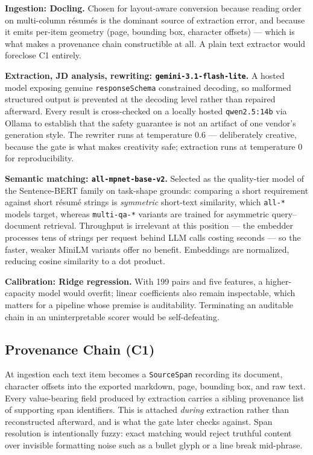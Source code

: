 \documentclass[conference]{IEEEtran}
\begin{document}
\textbf{Ingestion: Docling.} Chosen for layout-aware conversion because reading
order on multi-column résumés is the dominant source of extraction error, and
because it emits per-item geometry (page, bounding box, character offsets) ---
which is what makes a provenance chain constructible at all. A plain text
extractor would foreclose C1 entirely.

\textbf{Extraction, JD analysis, rewriting:
\texttt{gemini-3.1-flash-lite}.} A hosted model exposing genuine
\texttt{responseSchema} constrained decoding, so malformed structured output is
prevented at the decoding level rather than repaired afterward. Every result is
cross-checked on a locally hosted \texttt{qwen2.5:14b} via Ollama
\cite{ollama,qwen} to establish that the safety guarantee is not an artifact of
one vendor's generation style. The rewriter runs at temperature 0.6 ---
deliberately creative, because the gate is what makes creativity safe;
extraction runs at temperature 0 for reproducibility.

\textbf{Semantic matching: \texttt{all-mpnet-base-v2}.} Selected as the
quality-tier model of the Sentence-BERT family \cite{sbert} on task-shape
grounds: comparing a short requirement against short résumé strings is
\emph{symmetric} short-text similarity, which \texttt{all-*} models target,
whereas \texttt{multi-qa-*} variants are trained for asymmetric
query--document retrieval. Throughput is irrelevant at this position --- the
embedder processes tens of strings per request behind LLM calls costing seconds
--- so the faster, weaker MiniLM variants offer no benefit. Embeddings are
normalized, reducing cosine similarity to a dot product.

\textbf{Calibration: Ridge regression.} With 199 pairs and five features, a
higher-capacity model would overfit; linear coefficients also remain
inspectable, which matters for a pipeline whose premise is auditability.
Terminating an auditable chain in an uninterpretable scorer would be
self-defeating.

\subsection{Provenance Chain (C1)}

At ingestion each text item becomes a \texttt{SourceSpan} recording its
document, character offsets into the exported markdown, page, bounding box, and
raw text. Every value-bearing field produced by extraction carries a sibling
provenance list of supporting span identifiers. This is attached \emph{during}
extraction rather than reconstructed afterward, and is what the gate later
checks against. Span resolution is intentionally fuzzy: exact matching would
reject truthful content over invisible formatting noise such as a bullet glyph
or a line break mid-phrase.
\end{document}
